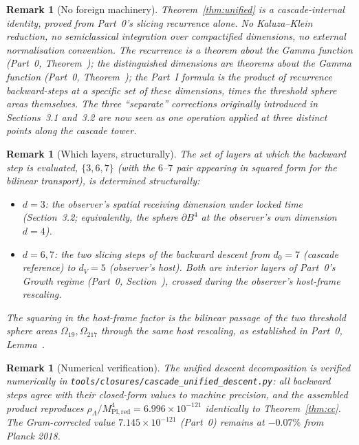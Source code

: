 \documentclass[11pt,a4paper]{article}
\newtheorem{remark}[theorem]{Remark}
\begin{document}
\begin{remark}[No foreign machinery]
Theorem~\ref{thm:unified} is a cascade-internal identity, proved from
Part~0's slicing recurrence alone. No Kaluza--Klein reduction, no
semiclassical integration over compactified dimensions, no external
normalisation convention. The recurrence is a theorem about the Gamma
function (Part~0, Theorem~); the distinguished dimensions are theorems
about the Gamma function (Part~0, Theorem~); the Part~I formula is
the product of recurrence backward-steps at a specific set of these
dimensions, times the threshold sphere areas themselves. The three
``separate'' corrections originally introduced in Sections~3.1 and~3.2
are now seen as one operation applied at three distinct points along
the cascade tower.
\end{remark}

\begin{remark}[Which layers, structurally]
The set of layers at which the backward step is evaluated,
$\{3, 6, 7\}$ (with the $6$--$7$ pair appearing in squared form for
the bilinear transport), is determined structurally:
\begin{itemize}[nosep]
\item $d = 3$: the observer's spatial receiving dimension under
locked time (Section~3.2; equivalently, the sphere $\partial B^4$ at
the observer's own dimension $d = 4$).
\item $d = 6, 7$: the two slicing steps of the backward descent from
$d_0 = 7$ (cascade reference) to $d_V = 5$ (observer's host). Both
are interior layers of Part~0's Growth regime
(Part~0, Section~), crossed during the observer's host-frame
rescaling.
\end{itemize}
The squaring in the host-frame factor is the bilinear passage of the
two threshold sphere areas $\Omega_{19}, \Omega_{217}$ through the
same host rescaling, as established in Part~0, Lemma~.
\end{remark}

\begin{remark}[Numerical verification]
The unified descent decomposition is verified numerically in
\texttt{tools/closures/cascade\_unified\_descent.py}: all backward steps agree
with their closed-form values to machine precision, and the
assembled product reproduces
$\rho_\Lambda / M^4_{\mathrm{Pl,red}} = 6.996\times 10^{-121}$
identically to Theorem~\ref{thm:cc}. The Gram-corrected value
$7.145\times 10^{-121}$ (Part~0) remains at $-0.07\%$
from Planck 2018.
\end{remark}
\end{document}
